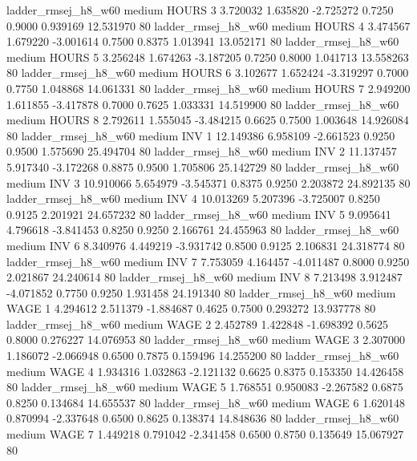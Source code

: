    ladder_rmsej_h8_w60     medium    HOURS                 3  3.720032 1.635820 -2.725272 0.7250 0.9000  0.939169   12.531970 80
   ladder_rmsej_h8_w60     medium    HOURS                 4  3.474567 1.679220 -3.001614 0.7500 0.8375  1.013941   13.052171 80
   ladder_rmsej_h8_w60     medium    HOURS                 5  3.256248 1.674263 -3.187205 0.7250 0.8000  1.041713   13.558263 80
   ladder_rmsej_h8_w60     medium    HOURS                 6  3.102677 1.652424 -3.319297 0.7000 0.7750  1.048868   14.061331 80
   ladder_rmsej_h8_w60     medium    HOURS                 7  2.949200 1.611855 -3.417878 0.7000 0.7625  1.033331   14.519900 80
   ladder_rmsej_h8_w60     medium    HOURS                 8  2.792611 1.555045 -3.484215 0.6625 0.7500  1.003648   14.926084 80
   ladder_rmsej_h8_w60     medium      INV                 1 12.149386 6.958109 -2.661523 0.9250 0.9500  1.575690   25.494704 80
   ladder_rmsej_h8_w60     medium      INV                 2 11.137457 5.917340 -3.172268 0.8875 0.9500  1.705806   25.142729 80
   ladder_rmsej_h8_w60     medium      INV                 3 10.910066 5.654979 -3.545371 0.8375 0.9250  2.203872   24.892135 80
   ladder_rmsej_h8_w60     medium      INV                 4 10.013269 5.207396 -3.725007 0.8250 0.9125  2.201921   24.657232 80
   ladder_rmsej_h8_w60     medium      INV                 5  9.095641 4.796618 -3.841453 0.8250 0.9250  2.166761   24.455963 80
   ladder_rmsej_h8_w60     medium      INV                 6  8.340976 4.449219 -3.931742 0.8500 0.9125  2.106831   24.318774 80
   ladder_rmsej_h8_w60     medium      INV                 7  7.753059 4.164457 -4.011487 0.8000 0.9250  2.021867   24.240614 80
   ladder_rmsej_h8_w60     medium      INV                 8  7.213498 3.912487 -4.071852 0.7750 0.9250  1.931458   24.191340 80
   ladder_rmsej_h8_w60     medium     WAGE                 1  4.294612 2.511379 -1.884687 0.4625 0.7500  0.293272   13.937778 80
   ladder_rmsej_h8_w60     medium     WAGE                 2  2.452789 1.422848 -1.698392 0.5625 0.8000  0.276227   14.076953 80
   ladder_rmsej_h8_w60     medium     WAGE                 3  2.307000 1.186072 -2.066948 0.6500 0.7875  0.159496   14.255200 80
   ladder_rmsej_h8_w60     medium     WAGE                 4  1.934316 1.032863 -2.121132 0.6625 0.8375  0.153350   14.426458 80
   ladder_rmsej_h8_w60     medium     WAGE                 5  1.768551 0.950083 -2.267582 0.6875 0.8250  0.134684   14.655537 80
   ladder_rmsej_h8_w60     medium     WAGE                 6  1.620148 0.870994 -2.337648 0.6500 0.8625  0.138374   14.848636 80
   ladder_rmsej_h8_w60     medium     WAGE                 7  1.449218 0.791042 -2.341458 0.6500 0.8750  0.135649   15.067927 80
